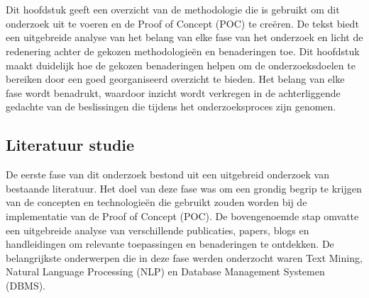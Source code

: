 
\chapter{}%
\label{ch:methodologie}


Dit hoofdstuk geeft een overzicht van de methodologie die is gebruikt om dit onderzoek uit te voeren en de Proof of Concept (POC) te creëren. De tekst biedt een uitgebreide analyse van het belang van elke fase van het onderzoek en licht de redenering achter de gekozen methodologieën en benaderingen toe. Dit hoofdstuk maakt duidelijk hoe de gekozen benaderingen helpen om de onderzoeksdoelen te bereiken door een goed georganiseerd overzicht te bieden. Het belang van elke fase wordt benadrukt, waardoor inzicht wordt verkregen in de achterliggende gedachte van de beslissingen die tijdens het onderzoeksproces zijn genomen.

\section{Literatuur studie}
De eerste fase van dit onderzoek bestond uit een uitgebreid onderzoek van bestaande literatuur. Het doel van deze fase was om een grondig begrip te krijgen van de concepten en technologieën die gebruikt zouden worden bij de implementatie van de Proof of Concept (POC). De bovengenoemde stap omvatte een uitgebreide analyse van verschillende publicaties, papers, blogs en handleidingen om relevante toepassingen en benaderingen te ontdekken. De belangrijkste onderwerpen die in deze fase werden onderzocht waren Text Mining, Natural Language Processing (NLP) en Database Management Systemen (DBMS).

